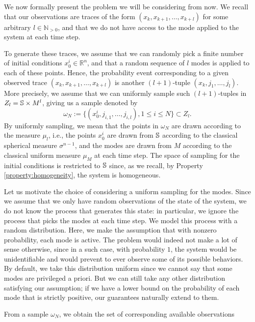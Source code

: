 We now formally present the problem we will be considering from now. We recall that our observations are traces of the form $(x_k,x_{k+1},\dots,x_{k+l})$ for some arbitrary $l \in \mathbb{N}_{>0}$, and that we do not have access to the mode applied to the system at each time step. 

To generate these traces, we assume that we can randomly pick a finite number of initial conditions $x_0^i \in \mathbb{R}^n$, and that a random sequence of $l$ modes is applied to each of these points. Hence, the probability event corresponding to a given observed trace $(x_k,x_{k+1},\dots,x_{k+l})$ is another $(l+1)$-tuple $(x_k,j_1,\dots,j_l)$. More precisely, we assume that we can uniformly sample such $(l+1)$-tuples in $Z_l = \mathbb{S} \times M^l$, giving us a sample denoted by 
\begin{equation*}
\omega_N := \{(x_0^i, j_{i,1}, \dots, j_{i,l}), 1 \leq i \leq N \}  \subset Z_l.
\end{equation*}
By uniformly sampling, we mean that the points in $\omega_N$ are drawn according to the measure $\mu_l$, i.e., the points $x_0^i$ are drawn from $\mathbb{S}$ according to the classical spherical measure $\sigma^{n-1}$, and the modes are drawn from $M$ according to the classical uniform measure $\mu_M$ at each time step. The space of sampling for the initial conditions is restricted to $\mathbb{S}$ since, as we recall, by Property \ref{property:homogeneity}, the system is homogeneous. 
\begin{rem}
Let us motivate the choice of considering a uniform sampling for the modes. Since we assume that we only have random observations of the state of the system, we do not know the process that generates this state: in particular, we ignore the process that picks the modes at each time step. We model this process with a random distribution. Here, we make the assumption that with nonzero probability, each mode is active. The problem would indeed not make a lot of sense otherwise, since in a such case, with probability $1$, the system would be unidentifiable and would prevent to ever observe some of its possible behaviors. By default, we take this distribution uniform since we cannot say that some modes are privileged a priori. But we can still take any other distribution satisfying our assumption; if we have a lower bound on the probability of each mode that is strictly positive, our guarantees naturally extend to them.
\end{rem}
From a sample $\omega_N$, we obtain the set of corresponding available observations 
